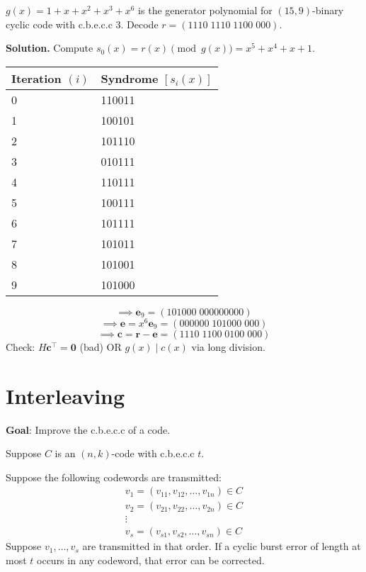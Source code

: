 \begin{Example}{}{}
    $ g(x)=1+x+x^2+x^3+x^6 $ is the generator polynomial for $ (15,9) $-binary
    cyclic code with c.b.e.c.c $ 3 $. Decode $ r=(1110\; 1110\; 1100\; 000) $.

    \textbf{Solution.}
    Compute $ s_0(x)=r(x)\pmod{g(x)}=x^5+x^4+x+1 $.

    \begin{table}[H]
        \centering
        \begin{tabularx}{0.8\linewidth}{@{}YY@{}}
            Iteration $ (i) $ & Syndrome $ [s_i(x)] $ \\
                             & 110011                \\
            1                 & 100101                \\
            2                 & 101110                \\
            3                 & 010111                \\
            4                 & 110111                \\
            5                 & 100111                \\
            6                 & 101111                \\
            7                 & 101011                \\
            8                 & 101001                \\
            9                 & 101000
        \end{tabularx}
    \end{table}

    \[ \implies \symbf{e}_9=(101000\; 000000000) \]
    \[ \implies \symbf{e}=x^6 \symbf{e}_9=(000000\; 101000\;000 ) \]
    \[ \implies \symbf{c}=\symbf{r}-\symbf{e}=(1110\;1100\;0100\;000) \]
    Check: $ H\symbf{c}^\top=\symbf{0} $ (bad) OR $ g(x)\mid c(x) $ via long division.
\end{Example}

\section{Interleaving}
\textbf{Goal}: Improve the c.b.e.c.c of a code.

Suppose $ C $ is an $ (n,k) $-code with c.b.e.c.c $ t $.

Suppose the following codewords are transmitted:
\[ \begin{array}{c}
        v_1=(v_{11},v_{12},\ldots ,v_{1n})\in C \\
        v_2=(v_{21},v_{22},\ldots ,v_{2n})\in C \\
        \vdots                                  \\
        v_s=(v_{s1},v_{s2},\ldots ,v_{s n})\in C
    \end{array} \]
Suppose $ v_1,\ldots ,v_s $ are transmitted in that order. If a cyclic burst error
of length at most $ t $ occurs in any codeword, that error can be corrected.

